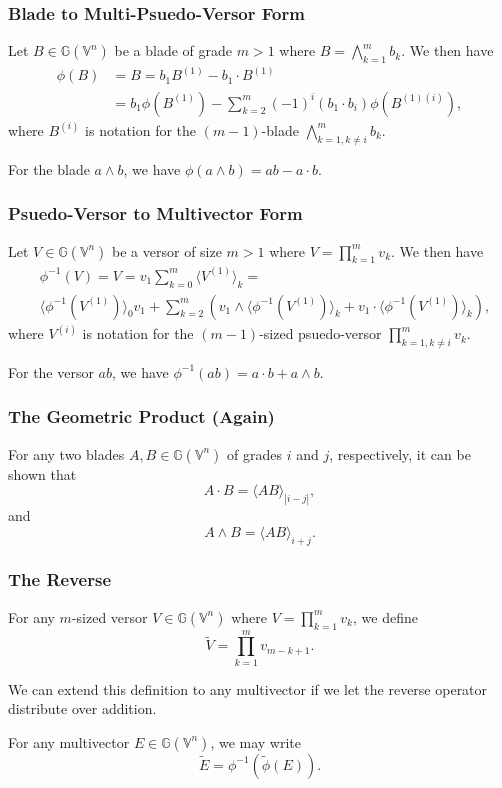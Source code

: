 \documentclass{beamer}
\newcommand{\G}{\mathbb{G}}
\newcommand{\V}{\mathbb{V}}
\begin{document}
\begin{frame}
\frametitle{Blade to Multi-Psuedo-Versor Form}
Let $B\in\G(\V^n)$ be a blade of grade $m>1$ where $B=\bigwedge_{k=1}^m b_k$.
We then have
\begin{align*}
\phi(B) &= B = b_1 B^{(1)} - b_1\cdot B^{(1)} \\
& = b_1 \phi(B^{(1)}) - \sum_{k=2}^m(-1)^i (b_1\cdot b_i)\phi(B^{(1)(i)}),
\end{align*}
where $B^{(i)}$ is notation for the $(m-1)$-blade $\bigwedge_{k=1,k\neq i}^m b_k$.
\begin{example}
For the blade $a\wedge b$, we have $\phi(a\wedge b)=ab-a\cdot b$.
\end{example}
\end{frame}

\begin{frame}
\frametitle{Psuedo-Versor to Multivector Form}
Let $V\in\G(\V^n)$ be a versor of size $m>1$ where $V=\prod_{k=1}^m v_k$.
We then have
\begin{align*}
 & \phi^{-1}(V) = V = v_1\sum_{k=0}^m\langle V^{(1)}\rangle_k = \\
 & \langle \phi^{-1}(V^{(1)})\rangle_0 v_1+\sum_{k=2}^m\left(
v_1\wedge\langle \phi^{-1}(V^{(1)})\rangle_k + v_1\cdot\langle \phi^{-1}(V^{(1)})\rangle_k\right),
\end{align*}
where $V^{(i)}$ is notation for the $(m-1)$-sized psuedo-versor $\prod_{k=1,k\neq i}^m v_k$.
\begin{example}
For the versor $ab$, we have $\phi^{-1}(ab)=a\cdot b+a\wedge b$.
\end{example}
\end{frame}

\begin{frame}
\frametitle{The Geometric Product (Again)}
\begin{lemma}
For any two blades $A,B\in\G(\V^n)$ of grades $i$ and $j$, respectively, it
can be shown that
\begin{equation*}
A\cdot B = \langle AB\rangle_{|i-j|},
\end{equation*}
and
\begin{equation*}
A\wedge B = \langle AB\rangle_{i+j}.
\end{equation*}
\end{lemma}
\end{frame}

\begin{frame}
\frametitle{The Reverse}
\begin{definition}
For any $m$-sized versor $V\in\G(\V^n)$ where $V=\prod_{k=1}^m v_k$,
we define
\begin{equation*}
\tilde{V} = \prod_{k=1}^m v_{m-k+1}.
\end{equation*}
\end{definition}
We can extend this definition to any multivector if we let
the reverse operator distribute over addition.
\begin{definition}
For any multivector $E\in\G(\V^n)$, we may write
\begin{equation*}
\tilde{E} = \phi^{-1}(\tilde{\phi}(E)).
\end{equation*}
\end{definition}
\end{frame}
\end{document}
